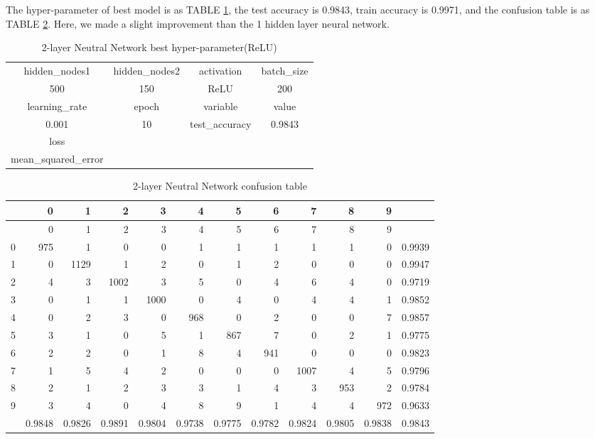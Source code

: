 \documentclass[conference]{IEEEtran}
\begin{document}
The hyper-parameter of best model is as TABLE \ref{2-layer Neutral Network best hyper-parameter(ReLU)}, the test accuracy is 0.9843, train accuracy is 0.9971, and the confusion table is as TABLE \ref{2-layer Neutral Network confusion table}. Here, we made a slight improvement than the 1 hidden layer neural network.
\begin{table}[htbp]
\small
\centering
\caption{2-layer Neutral Network best hyper-parameter(ReLU)}
\begin{tabular}{|c|c|c|c|}
  \hline
 hidden\_nodes1& hidden\_nodes2 & activation & batch\_size  \\

500& 150& ReLU & 200  \\
  \hline
learning\_rate & epoch & variable & value \\ 

 0.001 &   10 & test\_accuracy & 0.9843 \\ 
   \hline
 loss&&&\\
 mean\_squared\_error&&&\\
   \hline
\end{tabular}
\label{2-layer Neutral Network best hyper-parameter(ReLU)}	
\end{table}
\begin{table}[htbp]
\tiny
  \centering
  \caption{2-layer Neutral Network confusion table}
\begin{tabular}{|r|rrrrrrrrrr|r|}
\hline
  & 0 & 1 & 2 & 3 & 4 & 5 & 6 & 7 & 8 & 9 &  \\
\hline
  & 0 & 1 & 2 & 3 & 4 & 5 & 6 & 7 & 8 & 9 &  \\
0 & 975 & 1 & 0 & 0 & 1 & 1 & 1 & 1 & 1 & 0 & 0.9939 \\
1 & 0 & 1129 & 1 & 2 & 0 & 1 & 2 & 0 & 0 & 0 & 0.9947 \\
2 & 4 & 3 & 1002 & 3 & 5 & 0 & 4 & 6 & 4 & 0 & 0.9719 \\
3 & 0 & 1 & 1 & 1000 & 0 & 4 & 0 & 4 & 4 & 1 & 0.9852 \\
4 & 0 & 2 & 3 & 0 & 968 & 0 & 2 & 0 & 0 & 7 & 0.9857 \\
5 & 3 & 1 & 0 & 5 & 1 & 867 & 7 & 0 & 2 & 1 & 0.9775 \\
6 & 2 & 2 & 0 & 1 & 8 & 4 & 941 & 0 & 0 & 0 & 0.9823 \\
7 & 1 & 5 & 4 & 2 & 0 & 0 & 0 & 1007 & 4 & 5 & 0.9796 \\
8 & 2 & 1 & 2 & 3 & 3 & 1 & 4 & 3 & 953 & 2 & 0.9784 \\
9 & 3 & 4 & 0 & 4 & 8 & 9 & 1 & 4 & 4 & 972 & 0.9633 \\
\hline
  & 0.9848 & 0.9826 & 0.9891 & 0.9804 & 0.9738 & 0.9775 & 0.9782 & 0.9824 & 0.9805 & 0.9838 & 0.9843 \\
\hline
\end{tabular}%
\label{2-layer Neutral Network confusion table}%
\end{table}%
\end{document}
